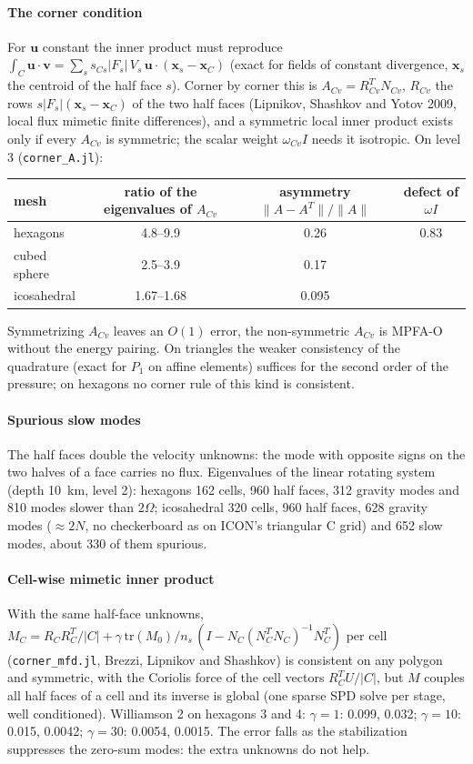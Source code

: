 \documentclass[11pt,a4paper]{article}
\newcommand{\code}[1]{\texttt{#1}}
\newcommand{\bx}{\mathbf{x}}
\newcommand{\bu}{\mathbf{u}}
\newcommand{\bv}{\mathbf{v}}
\begin{document}
\paragraph{The corner condition} For $\bu$ constant the inner product must reproduce
$\int_C\bu\cdot\bv = \sum_s s_{Cs}|F_s|\,V_s\,\bu\cdot(\bx_s - \bx_C)$ (exact for fields of constant
divergence, $\bx_s$ the centroid of the half face $s$). Corner by corner this is $A_{Cv} = R_{Cv}^TN_{Cv}$,
$R_{Cv}$ the rows $s|F_s|(\bx_s - \bx_C)$ of the two half faces (Lipnikov, Shashkov and Yotov 2009, local
flux mimetic finite differences), and a symmetric local inner product exists only if every $A_{Cv}$ is
symmetric; the scalar weight $\omega_{Cv}I$ needs it isotropic. On level 3 (\code{corner\_A.jl}):
\begin{center}\small
\begin{tabular}{lccc}
\toprule
mesh & ratio of the eigenvalues of $A_{Cv}$ & asymmetry $\|A - A^T\|/\|A\|$ & defect of $\omega I$ \\
\midrule
hexagons & 4.8--9.9 & 0.26 & 0.83 \\
cubed sphere & 2.5--3.9 & 0.17 & \\
icosahedral & 1.67--1.68 & 0.095 & \\
\bottomrule
\end{tabular}
\end{center}
Symmetrizing $A_{Cv}$ leaves an $O(1)$ error, the non-symmetric $A_{Cv}$ is MPFA-O without the energy
pairing. On triangles the weaker consistency of the quadrature (exact for $P_1$ on affine elements)
suffices for the second order of the pressure; on hexagons no corner rule of this kind is consistent.

\paragraph{Spurious slow modes} The half faces double the velocity unknowns: the mode with opposite signs
on the two halves of a face carries no flux. Eigenvalues of the linear rotating system (depth 10~km,
level 2): hexagons 162 cells, 960 half faces, 312 gravity modes and 810 modes slower than $2\Omega$;
icosahedral 320 cells, 960 half faces, 628 gravity modes ($\approx 2N$, no checkerboard as on ICON's
triangular C grid) and 652 slow modes, about 330 of them spurious.

\paragraph{Cell-wise mimetic inner product} With the same half-face unknowns,
$M_C = R_CR_C^T/|C| + \gamma\,\mathrm{tr}(M_0)/n_s\,(I - N_C(N_C^TN_C)^{-1}N_C^T)$ per cell
(\code{corner\_mfd.jl}, Brezzi, Lipnikov and Shashkov) is consistent on any polygon and symmetric, with
the Coriolis force of the cell vectors $R_C^TU/|C|$, but $M$ couples all half faces of a cell and its
inverse is global (one sparse SPD solve per stage, well conditioned). Williamson 2 on hexagons 3 and 4:
$\gamma = 1$: 0.099, 0.032; $\gamma = 10$: 0.015, 0.0042; $\gamma = 30$: 0.0054, 0.0015. The error falls
as the stabilization suppresses the zero-sum modes: the extra unknowns do not help.
\end{document}
